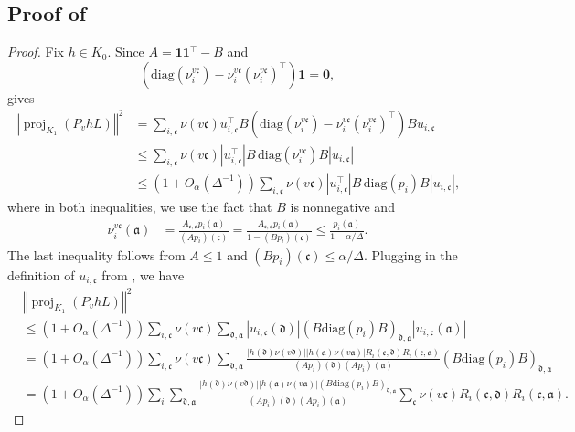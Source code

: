 \documentclass[a4paper,12pt]{article}
\theoremstyle{plain}
\theoremstyle{definition}
\def\*#1{\mathbf{#1}} %
\def\!#1{\mathfrak{#1}} %
\def\*#1{\boldsymbol{#1}} %
\def\!#1{\mathfrak{#1}} %
\newcommand{\norm}[1]{\left\Vert#1\right\Vert}
\newcommand{\tuple}[1]{\left(#1\right)}
\newcommand{\tp}{\tuple}
\newcommand{\abs}[1]{\left\vert#1\right\vert}
\begin{document}
\subsection{Proof of }
\label{sec:related-to-contraction}

\begin{proof}
  Fix $h\in K_0$. Since $A=\*1\*1^\intercal-B$ and
  \[\tp{\mathrm{diag}(\nu^{v\!c}_i) - \nu^{v\!c}_i(\nu^{v\!c}_i)^\intercal}\*1=\*0,\]
  gives
\begin{align*}
  \norm{\operatorname{proj}_{K_1}(P_vhL)}^2
  &=
  \sum_{i,\!c}\nu(v\!c)
  u_{i,\!c}^\intercal B \tp{\mathrm{diag}(\nu^{v\!c}_i) - \nu^{v\!c}_i(\nu^{v\!c}_i)^\intercal} B u_{i,\!c} \\
  &\leq 
  \sum_{i,\!c}\nu(v\!c)
  \abs{u_{i,\!c}^\intercal} B\, \mathrm{diag}(\nu^{v\!c}_i) B \abs{u_{i,\!c}} \\
  &\leq 
  \tp{1 + O_\alpha(\Delta^{-1})} \sum_{i,\!c}\nu(v\!c)
  \abs{u_{i,\!c}^\intercal} B\, \mathrm{diag}(p_i) B \abs{u_{i,\!c}},
\end{align*}
where in both inequalities, we use the fact that $B$ is nonnegative and
\begin{align*}
  \nu^{v\!c}_i(\!a) &= \frac{A_{\!c,\!a}p_i(\!a)}{(Ap_i)(\!c)} 
  = \frac{A_{\!c,\!a} p_i(\!a)}{1-(Bp_i)(\!c)}
  \leq \frac{p_i(\!a)}{1-\alpha/\Delta}.
\end{align*}
The last inequality follows from $A \leq 1$ and $(Bp_i)(\!c) \leq \alpha/\Delta$.
Plugging in the definition of $u_{i,\!c}$ from , we have
\begin{align*}
  &\norm{\operatorname{proj}_{K_1}(P_vhL)}^2 \\
  &\leq \tp{1 + O_\alpha(\Delta^{-1})} \sum_{i,\!c} \nu(v\!c) \sum_{\!d,\!a} \abs{u_{i,\!c}(\!d)} (B\mathrm{diag}(p_i)B)_{\!d,\!a} \abs{u_{i,\!c}(\!a)} \\
  &= \tp{1 + O_\alpha(\Delta^{-1})} \sum_{i,\!c} \nu(v\!c) \sum_{\!d,\!a} \frac{\abs{h(\!d)\nu(v\!d)}\abs{h(\!a)\nu(v\!a)}R_i(\!c,\!d)R_i(\!c,\!a)}{(Ap_i)(\!d)(Ap_i)(\!a)} (B\mathrm{diag}(p_i)B)_{\!d,\!a} \\
  &= \tp{1 + O_\alpha(\Delta^{-1})} \sum_{i} \sum_{\!d,\!a} \frac{\abs{h(\!d)\nu(v\!d)}\abs{h(\!a)\nu(v\!a)}(B\mathrm{diag}(p_i)B)_{\!d,\!a}}{(Ap_i)(\!d)(Ap_i)(\!a)} \sum_{\!c}\nu(v\!c) R_i(\!c,\!d)R_i(\!c,\!a).

\end{align*}
\end{proof}
\end{document}
